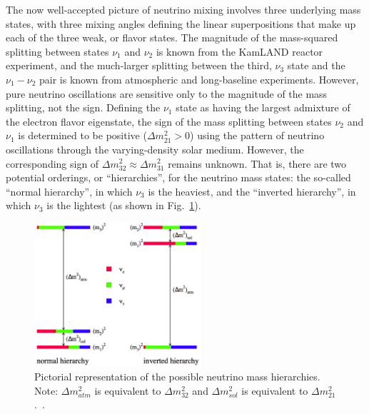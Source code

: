 The now well-accepted picture of neutrino mixing involves three underlying mass states, with three mixing angles defining the linear superpositions that make up each of the three weak, or flavor states.  The magnitude of the mass-squared splitting between states $\nu_1$ and $\nu_2$ is known from the KamLAND reactor experiment, and the much-larger splitting between  the third, $\nu_3$ state and the $\nu_1-\nu_2$ pair is known from atmospheric and long-baseline experiments.  However, pure neutrino oscillations are sensitive only to the magnitude of the mass splitting, not the sign.  
Defining the $\nu_1$ state as having the largest admixture of the electron flavor eigenstate, the sign of the mass splitting between states $\nu_2$ and $\nu_1$ is determined to be positive ($\Delta m^2_{21} > 0$) using the pattern of neutrino oscillations through the varying-density solar medium.
However, the corresponding sign of $\Delta m^2_{32}\approx \Delta m^2_{31}$ remains unknown.  That is, there are two potential orderings, or ``hierarchies'', for the neutrino mass states: the so-called ``normal hierarchy'', in which $\nu_3$ is the heaviest, and the ``inverted hierarchy'', in which $\nu_3$ is the lightest (as shown in Fig.~\ref{f:hierfig}).


\begin{figure}[!ht]
\begin{center}
\includegraphics[width=0.55\textwidth]{./hierfig.pdf}
\caption{ Pictorial representation of the possible neutrino mass hierarchies.  Note: $\Delta m^2_{atm}$ is equivalent to $\Delta m^2_{32}$ and  $\Delta m^2_{sol}$ is equivalent to $\Delta m^2_{21}$.~\cite{gouvea}.
\label{f:hierfig}}
\end{center}
\vspace{-0.2cm}
\end{figure} 

